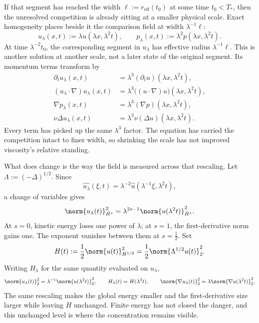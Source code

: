 
If that segment has reached the width \(\ell:=r_{\mathrm{eff}}(t_0)\) at some time \(t_0<T_*\), then the unresolved competition is already sitting at a smaller physical scale. Exact \NavierStokes{} homogeneity places beside it the comparison field at width \(\lambda^{-1}\ell\):
\[
  u_\lambda(x,t)
  :=
  \lambda u(\lambda x,\lambda^2t),
  \qquad
  p_\lambda(x,t)
  :=
  \lambda^2p(\lambda x,\lambda^2t).
\]
At time \(\lambda^{-2}t_0\), the corresponding segment in \(u_\lambda\) has effective radius \(\lambda^{-1}\ell\). This is another solution at another scale, not a later state of the original segment. Its momentum terms transform by
\[
\begin{aligned}
  \partial_tu_\lambda(x,t)
  &=
  \lambda^3(\partial_tu)(\lambda x,\lambda^2t),
  \\
  (u_\lambda\cdot\nabla)u_\lambda(x,t)
  &=
  \lambda^3\bigl((u\cdot\nabla)u\bigr)(\lambda x,\lambda^2t),
  \\
  \nabla p_\lambda(x,t)
  &=
  \lambda^3(\nabla p)(\lambda x,\lambda^2t),
  \\
  \nu\Delta u_\lambda(x,t)
  &=
  \lambda^3\nu(\Delta u)(\lambda x,\lambda^2t).
\end{aligned}
\]
Every term has picked up the same \(\lambda^3\) factor. The equation has carried the competition intact to finer width, so shrinking the scale has not improved viscosity's relative standing.


What does change is the way the field is measured across that rescaling. Let \(\Lambda:=(-\Delta)^{1/2}\). Since
\[
  \widehat{u_\lambda}(\xi,t)
  =
  \lambda^{-2}\widehat u(\lambda^{-1}\xi,\lambda^2t),
\]
a change of variables gives
\[
  \norm{u_\lambda(t)}_{\dot H^s}^2
  =
  \lambda^{2s-1}
  \norm{u(\lambda^2t)}_{\dot H^s}^2.
\]
At \(s=0\), kinetic energy loses one power of \(\lambda\); at \(s=1\), the first-derivative norm gains one. The exponent vanishes between them at \(s=\tfrac12\). Set
\[
  H(t)
  :=
  \frac12\norm{u(t)}_{\dot H^{1/2}}^2
  =
  \frac12\norm{\Lambda^{1/2}u(t)}_2^2.
\]
Writing \(H_\lambda\) for the same quantity evaluated on \(u_\lambda\),
\[
  \norm{u_\lambda(t)}_2^2
  =
  \lambda^{-1}\norm{u(\lambda^2t)}_2^2,
  \qquad
  H_\lambda(t)=H(\lambda^2t),
  \qquad
  \norm{\nabla u_\lambda(t)}_2^2
  =
  \lambda\norm{\nabla u(\lambda^2t)}_2^2.
\]
The same rescaling makes the global energy smaller and the first-derivative size larger while leaving \(H\) unchanged. Finite energy has not closed the danger, and this unchanged level is where the concentration remains visible.

